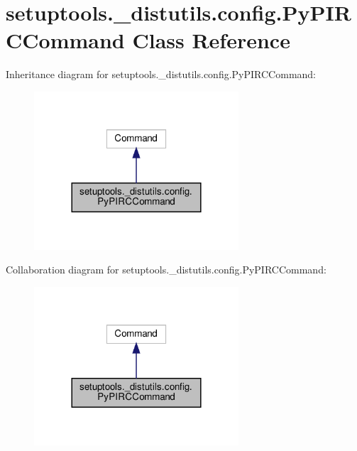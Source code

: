 \hypertarget{classsetuptools_1_1__distutils_1_1config_1_1PyPIRCCommand}{}\section{setuptools.\+\_\+distutils.\+config.\+Py\+P\+I\+R\+C\+Command Class Reference}
\label{classsetuptools_1_1__distutils_1_1config_1_1PyPIRCCommand}


Inheritance diagram for setuptools.\+\_\+distutils.\+config.\+Py\+P\+I\+R\+C\+Command\+:
\nopagebreak
\begin{figure}[H]
\begin{center}
\leavevmode
\includegraphics[width=216pt]{classsetuptools_1_1__distutils_1_1config_1_1PyPIRCCommand__inherit__graph}
\end{center}
\end{figure}


Collaboration diagram for setuptools.\+\_\+distutils.\+config.\+Py\+P\+I\+R\+C\+Command\+:
\nopagebreak
\begin{figure}[H]
\begin{center}
\leavevmode
\includegraphics[width=216pt]{classsetuptools_1_1__distutils_1_1config_1_1PyPIRCCommand__coll__graph}
\end{center}
\end{figure}

